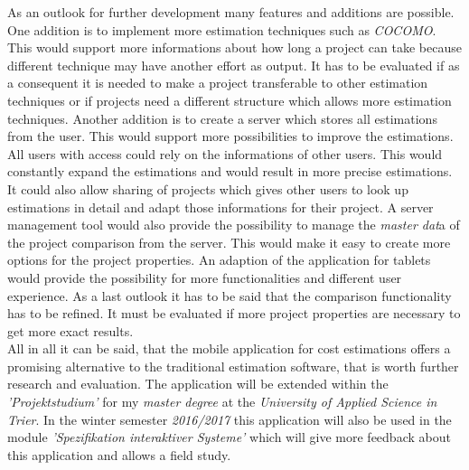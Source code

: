 As an outlook for further development many features and additions are possible. One addition is to implement more estimation techniques such as \textit{COCOMO}. This would support more informations about how long a project can take because different technique may have another effort as output. It has to be evaluated if as a consequent it is needed to make a project transferable to other estimation techniques or if projects need a different structure which allows more estimation techniques. Another addition is to create a server which stores all estimations from the user. This would support more possibilities to improve the estimations. All users with access could rely on the informations of other users. This would constantly expand the estimations and would result in more precise estimations. It could also allow sharing of projects which gives other users to look up estimations in detail and adapt those informations for their project. A server management tool would also provide the possibility to manage the \textit{master dat}a of the project comparison from the server. This would make it easy to create more options for the project properties. An adaption of the application for tablets would provide the possibility for more functionalities and different user experience. As a last outlook it has to be said that the comparison functionality has to be refined. It must be evaluated if more project properties are necessary to get more exact results.\\
All in all it can be said, that the mobile application for cost estimations offers a promising alternative to the traditional estimation software, that is worth further research and evaluation. The application will be extended within the \textit{'Projektstudium'} for my \textit{master degree} at the \textit{University of Applied Science in Trier}. In the winter semester \textit{2016/2017} this application will also be used in the module \textit{'Spezifikation interaktiver Systeme'} which will give more feedback about this application and allows a field study.